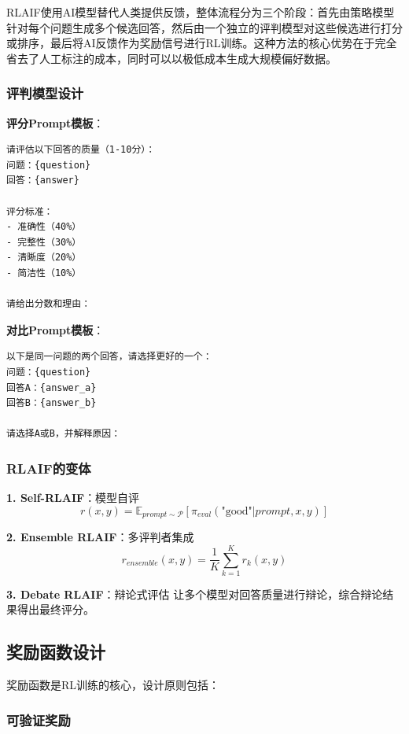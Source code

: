 \documentclass[12pt,a4paper]{article}
\begin{document}
RLAIF使用AI模型替代人类提供反馈，整体流程分为三个阶段：首先由策略模型针对每个问题生成多个候选回答，然后由一个独立的评判模型对这些候选进行打分或排序，最后将AI反馈作为奖励信号进行RL训练。这种方法的核心优势在于完全省去了人工标注的成本，同时可以以极低成本生成大规模偏好数据。

\subsubsection{评判模型设计}

\textbf{评分Prompt模板}：
\begin{verbatim}
请评估以下回答的质量（1-10分）：
问题：{question}
回答：{answer}

评分标准：
- 准确性（40%）
- 完整性（30%）
- 清晰度（20%）
- 简洁性（10%）

请给出分数和理由：
\end{verbatim}

\textbf{对比Prompt模板}：
\begin{verbatim}
以下是同一问题的两个回答，请选择更好的一个：
问题：{question}
回答A：{answer_a}
回答B：{answer_b}

请选择A或B，并解释原因：
\end{verbatim}

\subsubsection{RLAIF的变体}

\textbf{1. Self-RLAIF}：模型自评
\begin{equation}
r(x, y) = \mathbb{E}_{prompt \sim \mathcal{P}}\left[\pi_{eval}(\text{"good"} | prompt, x, y)\right]
\end{equation}

\textbf{2. Ensemble RLAIF}：多评判者集成
\begin{equation}
r_{ensemble}(x, y) = \frac{1}{K}\sum_{k=1}^{K} r_k(x, y)
\end{equation}

\textbf{3. Debate RLAIF}：辩论式评估
让多个模型对回答质量进行辩论，综合辩论结果得出最终评分。

\subsection{奖励函数设计}

奖励函数是RL训练的核心，设计原则包括：

\subsubsection{可验证奖励}
\end{document}
